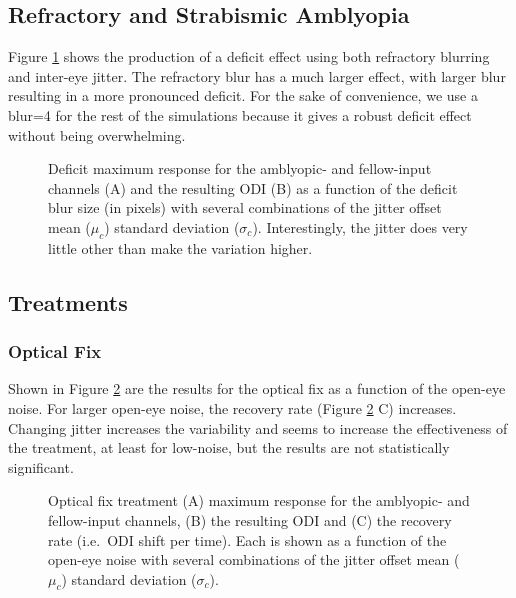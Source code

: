 \documentclass[
  sn-apa,
  pdflatex]{sn-jnl}
\theoremstyle{thmstyleone}%
\theoremstyle{thmstyletwo}%
\theoremstyle{thmstylethree}%
\begin{document}
\hypertarget{refractory-and-strabismic-amblyopia}{%
\subsection{Refractory and Strabismic
Amblyopia}\label{refractory-and-strabismic-amblyopia}}

Figure \ref{fig:deficit} shows the production of a deficit effect using
both refractory blurring and inter-eye jitter. The refractory blur has a
much larger effect, with larger blur resulting in a more pronounced
deficit. For the sake of convenience, we use a blur=4 for the rest of
the simulations because it gives a robust deficit effect without being
overwhelming.

\begin{figure}
\hypertarget{fig:deficit}{%
\centering

\caption{Deficit maximum response for the amblyopic- and fellow-input
channels (A) and the resulting ODI (B) as a function of the deficit blur
size (in pixels) with several combinations of the jitter offset mean
(\(\mu_c\)) standard deviation (\(\sigma_c\)). Interestingly, the jitter
does very little other than make the variation
higher.}\label{fig:deficit}
}
\end{figure}

\hypertarget{treatments}{%
\subsection{Treatments}\label{treatments}}

\hypertarget{optical-fix-1}{%
\subsubsection{Optical Fix}\label{optical-fix-1}}

Shown in Figure \ref{fig:fix-response-ODI-blur} are the results for the
optical fix as a function of the open-eye noise. For larger open-eye
noise, the recovery rate (Figure \ref{fig:fix-response-ODI-blur} C)
increases. Changing jitter increases the variability and seems to
increase the effectiveness of the treatment, at least for low-noise, but
the results are not statistically significant.

\begin{figure}
\hypertarget{fig:fix-response-ODI-blur}{%
\centering

\caption{Optical fix treatment (A) maximum response for the amblyopic-
and fellow-input channels, (B) the resulting ODI and (C) the recovery
rate (i.e.~ODI shift per time). Each is shown as a function of the
open-eye noise with several combinations of the jitter offset mean
(\(\mu_c\)) standard deviation
(\(\sigma_c\)).}\label{fig:fix-response-ODI-blur}
}
\end{figure}
\end{document}
